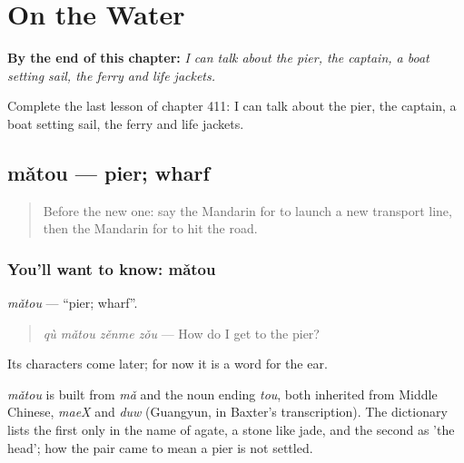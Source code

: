 
\chapter{On the Water}
\label{ch:zh-on-the-water}

\begin{chapteropening}
\textbf{By the end of this chapter:} \emph{I can talk about the pier, the captain, a boat setting sail, the ferry and life jackets.}

Complete the last lesson of chapter 411: I can talk about the pier, the captain, a boat setting sail, the ferry and life jackets.
\end{chapteropening}

\section[mǎtou]{mǎtou — pier; wharf}

\label{lesson:ZH-C411-matou}



\begin{quote}
Before the new one: say the Mandarin for to launch a new transport line, then the Mandarin for to hit the road.
\end{quote}

\subsection*{You'll want to know: mǎtou}
\emph{mǎtou} — \textquotedblleft{}pier; wharf\textquotedblright{}.

\begin{quote}
\emph{qù mǎtou zěnme zǒu} — How do I get to the pier?
\end{quote}

Its characters come later; for now it is a word for the ear.

\begin{cousinweb}
\emph{mǎtou} is built from \emph{mǎ} and the noun ending \emph{tou}, both inherited from Middle Chinese, \emph{maeX} and \emph{duw} (Guangyun, in Baxter's transcription). The dictionary lists the first only in the name of agate, a stone like jade, and the second as 'the head'; how the pair came to mean a pier is not settled.
\end{cousinweb}

